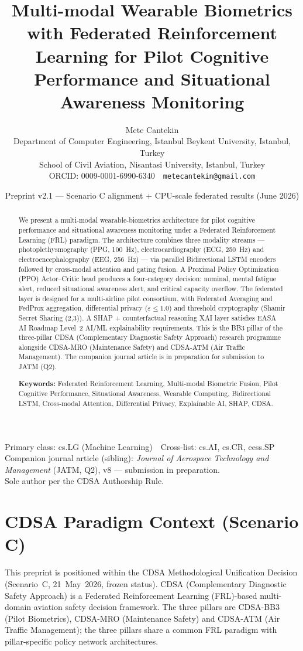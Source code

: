 \documentclass[11pt]{article}
\title{\bfseries Multi-modal Wearable Biometrics with Federated Reinforcement Learning for Pilot Cognitive Performance and Situational Awareness Monitoring}
\author{Mete Cantekin\\[2pt]
\normalsize Department of Computer Engineering, Istanbul Beykent University, Istanbul, Turkey\\
\normalsize School of Civil Aviation, Nisantasi University, Istanbul, Turkey\\
\normalsize ORCID: 0009-0001-6990-6340 \,\textperiodcentered\, \texttt{metecantekin@gmail.com}}
\date{Preprint v2.1 --- Scenario C alignment + CPU-scale federated results (June 2026)}
\begin{document}
\maketitle

\begin{center}\small
Primary class: cs.LG (Machine Learning) \,\textperiodcentered\, Cross-list: cs.AI, cs.CR, eess.SP\\
Companion journal article (sibling): \emph{Journal of Aerospace Technology and Management} (JATM, Q2), v8 --- submission in preparation.\\
Sole author per the CDSA Authorship Rule.
\end{center}

\begin{abstract}
\noindent We present a multi-modal wearable-biometrics architecture for pilot cognitive performance and situational awareness monitoring under a Federated Reinforcement Learning (FRL) paradigm. The architecture combines three modality streams --- photoplethysmography (PPG, 100~Hz), electrocardiography (ECG, 250~Hz) and electroencephalography (EEG, 256~Hz) --- via parallel Bidirectional LSTM encoders followed by cross-modal attention and gating fusion. A Proximal Policy Optimization (PPO) Actor--Critic head produces a four-category decision: nominal, mental fatigue alert, reduced situational awareness alert, and critical capacity overflow. The federated layer is designed for a multi-airline pilot consortium, with Federated Averaging and FedProx aggregation, differential privacy ($\varepsilon \le 1.0$) and threshold cryptography (Shamir Secret Sharing (2,3)). A SHAP + counterfactual reasoning XAI layer satisfies EASA AI Roadmap Level~2 AI/ML explainability requirements. This is the BB3 pillar of the three-pillar CDSA (Complementary Diagnostic Safety Approach) research programme alongside CDSA-MRO (Maintenance Safety) and CDSA-ATM (Air Traffic Management). The companion journal article is in preparation for submission to JATM (Q2).

\medskip
\noindent\textbf{Keywords:} Federated Reinforcement Learning, Multi-modal Biometric Fusion, Pilot Cognitive Performance, Situational Awareness, Wearable Computing, Bidirectional LSTM, Cross-modal Attention, Differential Privacy, Explainable AI, SHAP, CDSA.
\end{abstract}

\section*{CDSA Paradigm Context (Scenario C)}
This preprint is positioned within the CDSA Methodological Unification Decision (Scenario~C, 21~May~2026, frozen status). CDSA (Complementary Diagnostic Safety Approach) is a Federated Reinforcement Learning (FRL)-based multi-domain aviation safety decision framework. The three pillars are CDSA-BB3 (Pilot Biometrics), CDSA-MRO (Maintenance Safety) and CDSA-ATM (Air Traffic Management); the three pillars share a common FRL paradigm with pillar-specific policy network architectures.
\end{document}

